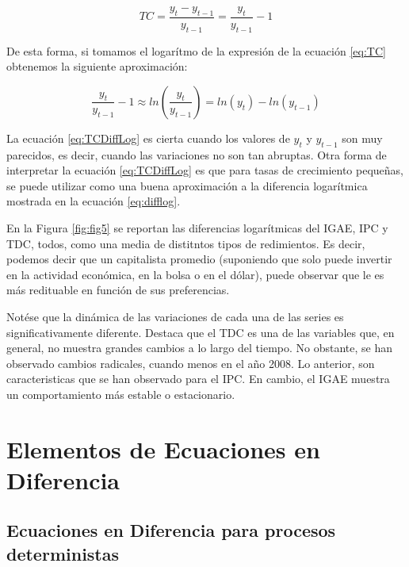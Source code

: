 \documentclass[
]{book}
\begin{document}
\begin{equation}
    TC = \frac{y_t - y_{t-1}}{y_{t-1}} = \frac{y_t}{y_{t-1}} - 1
    \label{eq:TC}
\end{equation}

De esta forma, si tomamos el logarítmo de la expresión de la ecuación \eqref{eq:TC} obtenemos la siguiente aproximación:

\begin{equation}
    \frac{y_t}{y_{t-1}} -1  \approx ln \left( \frac{y_t}{y_{t-1}} \right) = ln(y_t) - ln(y_{t-1})
    \label{eq:TCDiffLog}
\end{equation}

La ecuación \eqref{eq:TCDiffLog} es cierta cuando los valores de \(y_t\) y \(y_{t-1}\) son muy parecidos, es decir, cuando las variaciones no son tan abruptas. Otra forma de interpretar la ecuación \eqref{eq:TCDiffLog} es que para tasas de crecimiento pequeñas, se puede utilizar como una buena aproximación a la diferencia logarítmica mostrada en la ecuación \eqref{eq:difflog}.

En la Figura \ref{fig:fig5} se reportan las diferencias logarítmicas del IGAE, IPC y TDC, todos, como una media de distitntos tipos de redimientos. Es decir, podemos decir que un capitalista promedio (suponiendo que solo puede invertir en la actividad económica, en la bolsa o en el dólar), puede observar que le es más redituable en función de sus preferencias.

Notése que la dinámica de las variaciones de cada una de las series es significativamente diferente. Destaca que el TDC es una de las variables que, en general, no muestra grandes cambios a lo largo del tiempo. No obstante, se han observado cambios radicales, cuando menos en el año 2008. Lo anterior, son caracteristicas que se han observado para el IPC. En cambio, el IGAE muestra un comportamiento más estable o estacionario.

\hypertarget{elementos-de-ecuaciones-en-diferencia}{%
\chapter{Elementos de Ecuaciones en Diferencia}\label{elementos-de-ecuaciones-en-diferencia}}

\hypertarget{ecuaciones-en-diferencia-para-procesos-deterministas}{%
\section{Ecuaciones en Diferencia para procesos deterministas}\label{ecuaciones-en-diferencia-para-procesos-deterministas}}
\end{document}
